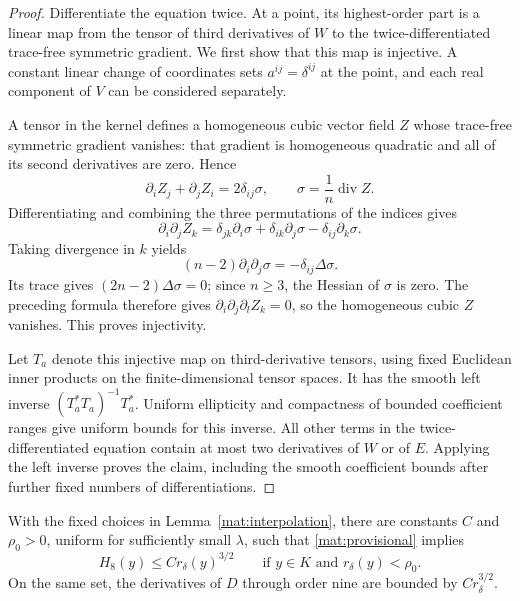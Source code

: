 \begin{proof}
Differentiate the equation twice.  At a point, its highest-order part
is a linear map from the tensor of third derivatives of $W$ to the
twice-differentiated trace-free symmetric gradient.  We first show
that this map is injective.  A constant linear change of coordinates
sets $a^{ij}=\delta^{ij}$ at the point, and each real component of
$V$ can be considered separately.

A tensor in the kernel defines a homogeneous cubic vector field $Z$
whose trace-free symmetric gradient vanishes: that gradient is
homogeneous quadratic and all of its second derivatives are zero.
Hence
\begin{equation}
 \partial_iZ_j+\partial_jZ_i=2\delta_{ij}\sigma,
                 \qquad \sigma=\frac1n\operatorname{div}Z.
 \label{mat:CK-cubic}
\end{equation}
Differentiating and combining the three permutations of the indices
gives
\[
 \partial_i\partial_jZ_k
   =\delta_{jk}\partial_i\sigma
      +\delta_{ik}\partial_j\sigma
      -\delta_{ij}\partial_k\sigma.
\]
Taking divergence in $k$ yields
\[
 (n-2)\partial_i\partial_j\sigma=-\delta_{ij}\Delta\sigma.
\]
Its trace gives $(2n-2)\Delta\sigma=0$; since $n\ge3$, the Hessian of
$\sigma$ is zero.  The preceding formula therefore gives
$\partial_i\partial_j\partial_lZ_k=0$, so the homogeneous cubic $Z$
vanishes.  This proves injectivity.

Let $T_a$ denote this injective map on third-derivative tensors, using
fixed Euclidean inner products on the finite-dimensional tensor
spaces.  It has the smooth left inverse
$(T_a^*T_a)^{-1}T_a^*$.  Uniform ellipticity and compactness of bounded
coefficient ranges give uniform bounds for this inverse.  All other
terms in the twice-differentiated equation contain at most two
derivatives of $W$ or of $E$.  Applying the left inverse proves the
claim, including the smooth coefficient bounds after further fixed
numbers of differentiations.
\end{proof}

\begin{proposition}
\label{mat:improvement}
With the fixed choices in Lemma~\ref{mat:interpolation}, there are
constants $C$ and $\rho_0>0$, uniform for sufficiently small
$\lambda$, such that \eqref{mat:provisional} implies
\begin{equation}
                 H_8(y)\le C r_\delta(y)^{3/2}
       \qquad\text{if }y\in K\text{ and }r_\delta(y)<\rho_0.
 \label{mat:improved-h}
\end{equation}
On the same set, the derivatives of $D$ through order nine are bounded
by $Cr_\delta^{3/2}$.
\end{proposition}

